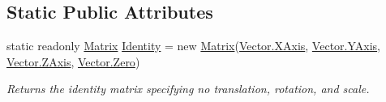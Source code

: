 \subsection*{Static Public Attributes}
\begin{DoxyCompactItemize}
\item 
static readonly \mbox{\hyperlink{struct_leap_1_1_matrix}{Matrix}} \mbox{\hyperlink{struct_leap_1_1_matrix_a54d2973a3dbf9699e9638f504768c81f}{Identity}} = new \mbox{\hyperlink{struct_leap_1_1_matrix}{Matrix}}(\mbox{\hyperlink{struct_leap_1_1_vector_ad62a202318bf591b431928859449b19c}{Vector.\+X\+Axis}}, \mbox{\hyperlink{struct_leap_1_1_vector_abf07de0f419b3de5776e046d35c0843e}{Vector.\+Y\+Axis}}, \mbox{\hyperlink{struct_leap_1_1_vector_a2b2f1a3a9334e812e832e3b1b6cd4384}{Vector.\+Z\+Axis}}, \mbox{\hyperlink{struct_leap_1_1_vector_a007c4ee68aa890118b7a2d24aa4d9a6b}{Vector.\+Zero}})
\begin{DoxyCompactList}\small\item\em Returns the identity matrix specifying no translation, rotation, and scale. \end{DoxyCompactList}\end{DoxyCompactItemize}
